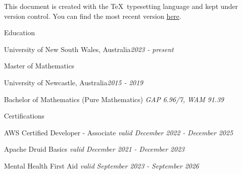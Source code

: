 \documentclass{resume} %
\begin{document}
This document is created with the \TeX \ typesetting language and kept under version control.
You can find the most recent version \href{https://github.com/joegurr/resume/blob/main/resume.pdf}{here}.


\begin{rSection}{Education}
    \begin{rSubsection}{University of New South Wales, Australia}{\em 2023 - present}{}{}
        \item Master of Mathematics
    \end{rSubsection}
    \begin{rSubsection}{University of Newcastle, Australia}{\em 2015 - 2019}{}{}
        \item Bachelor of Mathematics (Pure Mathematics) \hfill {\em GAP 6.96/7, WAM 91.39}
    \end{rSubsection}
\end{rSection}


\begin{rSection}{Certifications}
    \item AWS Certified Developer - Associate \hfill {\em valid December 2022 - December 2025}
    \item Apache Druid Basics \hfill {\em valid December 2021 - December 2023}
    \item Mental Health First Aid \hfill {\em valid September 2023 - September 2026}
\end{rSection}

\end{document}
